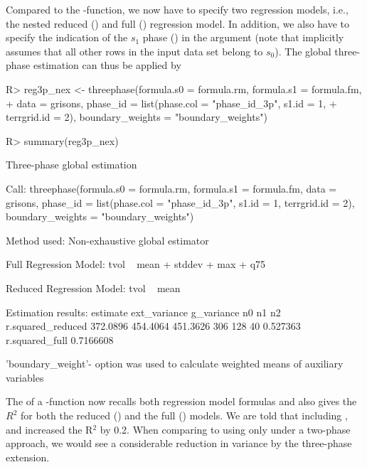 Compared to the -function, we now have to specify two regression models, i.e., the nested reduced () and full () regression model. In addition, we also have to specify the indication of the $s_1$ phase () in the argument  (note that  implicitly assumes that all other rows in the input data set belong to $s_0$). The global three-phase estimation can thus be applied by

\begin{small}
\begin{Schunk}
\begin{Sinput}
R> reg3p_nex <- threephase(formula.s0 = formula.rm, formula.s1 = formula.fm, 
+    data = grisons, phase_id = list(phase.col = "phase_id_3p", s1.id = 1,  
+    terrgrid.id = 2), boundary_weights = "boundary_weights")
\end{Sinput}
\end{Schunk}
\end{small}

\begin{small}
\begin{Schunk}
\begin{Sinput}
R> summary(reg3p_nex)
\end{Sinput}
\begin{Soutput}
Three-phase global estimation
 
Call: 
threephase(formula.s0 = formula.rm, formula.s1 = formula.fm, 
    data = grisons, phase_id = list(phase.col = "phase_id_3p", 
        s1.id = 1, terrgrid.id = 2), boundary_weights = "boundary_weights")

Method used:
Non-exhaustive global estimator
 
Full Regression Model:
tvol ~ mean + stddev + max + q75

Reduced Regression Model:
tvol ~ mean

Estimation results:
 estimate ext_variance g_variance  n0  n1 n2 r.squared_reduced
 372.0896     454.4064   451.3626 306 128 40          0.527363
 r.squared_full
      0.7166608

'boundary_weight'- option was used to calculate weighted means of auxiliary variables
\end{Soutput}
\end{Schunk}
\end{small}

The  of a -function now recalls both regression model formulas and also gives the $R^2$ for both the reduced () and the full () models. We are told that including ,  and  increased the R$^2$ by 0.2. When comparing to using only  under a two-phase approach, we would see a considerable reduction in variance by the three-phase extension.


